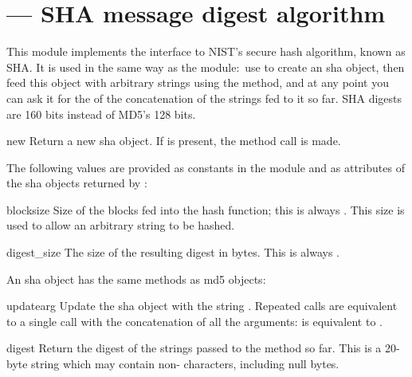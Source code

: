 \section{ ---
         SHA message digest algorithm}



This module implements the interface to NIST's secure hash 
algorithm, known as SHA.  It is used in
the same way as the  module:\ use 
to create an sha object, then feed this object with arbitrary strings
using the  method, and at any point you can ask it
for the  of the concatenation of the strings fed to it
so far.  SHA digests are 160 bits instead of
MD5's 128 bits.


\begin{funcdesc}{new}{}
  Return a new sha object.  If  is present, the method
  call  is made.
\end{funcdesc}


The following values are provided as constants in the module and as
attributes of the sha objects returned by :

\begin{datadesc}{blocksize}
  Size of the blocks fed into the hash function; this is always
  .  This size is used to allow an arbitrary string to be
  hashed.
\end{datadesc}

\begin{datadesc}{digest_size}
  The size of the resulting digest in bytes.  This is always
  .
\end{datadesc}


An sha object has the same methods as md5 objects:

\begin{methoddesc}[sha]{update}{arg}
Update the sha object with the string .  Repeated calls are
equivalent to a single call with the concatenation of all the
arguments:  is equivalent to
.
\end{methoddesc}

\begin{methoddesc}[sha]{digest}{}
Return the digest of the strings passed to the 
method so far.  This is a 20-byte string which may contain
non-\ASCII{} characters, including null bytes.
\end{methoddesc}

